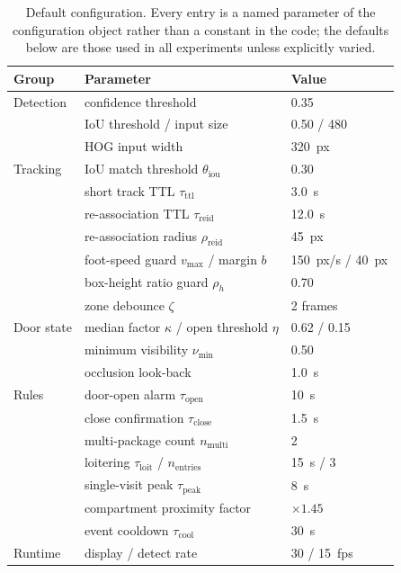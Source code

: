 \documentclass[journal,article,submit,oneauthor]{Definitions/mdpi}
\begin{document}
\begin{table}[H]
\caption{Default configuration. Every entry is a named parameter of the configuration
object rather than a constant in the code; the defaults below are those used in all
experiments unless explicitly varied.\label{tab:params}}
\small
\begin{tabularx}{\textwidth}{l l X}
\toprule
\textbf{Group} & \textbf{Parameter} & \textbf{Value} \\
\midrule
Detection & confidence threshold & 0.35 \\
 & IoU threshold / input size & 0.50 / 480 \\
 & HOG input width & 320~px \\
\midrule
Tracking & IoU match threshold $\theta_{\mathrm{iou}}$ & 0.30 \\
 & short track TTL $\tau_{\mathrm{ttl}}$ & 3.0~s \\
 & re-association TTL $\tau_{\mathrm{reid}}$ & 12.0~s \\
 & re-association radius $\rho_{\mathrm{reid}}$ & 45~px \\
 & foot-speed guard $v_{\max}$ / margin $b$ & 150~px/s / 40~px \\
 & box-height ratio guard $\rho_h$ & 0.70 \\
 & zone debounce $\zeta$ & 2 frames \\
\midrule
Door state & median factor $\kappa$ / open threshold $\eta$ & 0.62 / 0.15 \\
 & minimum visibility $\nu_{\min}$ & 0.50 \\
 & occlusion look-back & 1.0~s \\
\midrule
Rules & door-open alarm $\tau_{\mathrm{open}}$ & 10~s \\
 & close confirmation $\tau_{\mathrm{close}}$ & 1.5~s \\
 & multi-package count $n_{\mathrm{multi}}$ & 2 \\
 & loitering $\tau_{\mathrm{loit}}$ / $n_{\mathrm{entries}}$ & 15~s / 3 \\
 & single-visit peak $\tau_{\mathrm{peak}}$ & 8~s \\
 & compartment proximity factor & $\times 1.45$ \\
 & event cooldown $\tau_{\mathrm{cool}}$ & 30~s \\
\midrule
Runtime & display / detect rate & 30 / 15~fps \\
\bottomrule
\end{tabularx}
\end{table}
\end{document}
